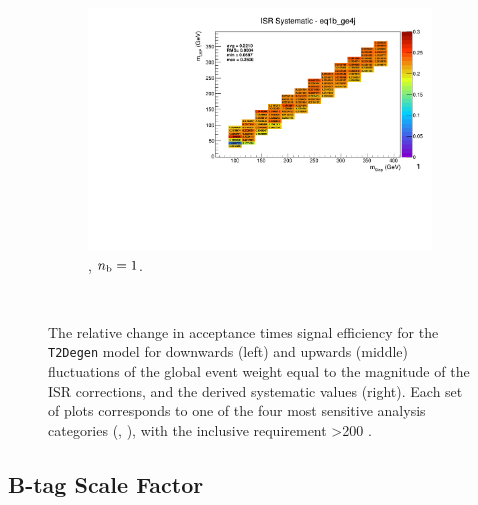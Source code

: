\begin{figure}[ht!]
\begin{subfigure}[b]{0.32\textwidth}
    \includegraphics[width=\textwidth, page=1]{Figs/sms/t2degen/v19/systs/T2_4body_ISR_eq1b_ge4j.pdf}
    \caption{\njhigh, $n_{\text{b}} = 1$.}
  \end{subfigure}\\
  \caption{The relative change in acceptance times signal efficiency for the
  \texttt{T2Degen} model for downwards (left) and upwards (middle) fluctuations
  of the global event weight equal to the magnitude of the ISR corrections,
  and the derived systematic values (right). Each set of plots corresponds
  to one of the four most sensitive analysis categories (\nb, \nj), with the
  inclusive requirement \HT>200 \gev.}
  \label{fig:sms-isr-t2degen}
\end{figure}


\newpage
\subsection*{B-tag Scale Factor}
\label{sec:t2degen_btag_plots}

